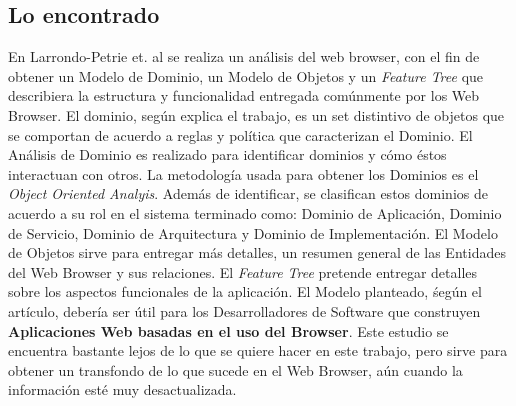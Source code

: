 \subsection{Lo encontrado}
En Larrondo-Petrie et. al \cite{535061} se realiza un análisis del web browser, con el fin de obtener un Modelo de Dominio, un Modelo de Objetos y un \textit{Feature Tree} que describiera la estructura y funcionalidad entregada comúnmente por los Web Browser. El dominio, según explica el trabajo, es un set distintivo de objetos que se comportan de acuerdo a reglas y política que caracterizan el Dominio. El Análisis de Dominio es realizado para identificar dominios y cómo éstos interactuan con otros. La metodología usada para obtener los Dominios es el \textit{Object Oriented Analyis}. Además de identificar, se clasifican estos dominios de acuerdo a su rol en el sistema terminado como: Dominio de Aplicación, Dominio de Servicio, Dominio de Arquitectura y Dominio de Implementación. El Modelo de Objetos sirve para entregar más detalles, un resumen general de las Entidades del Web Browser y sus relaciones. El \textit{Feature Tree} pretende entregar detalles sobre los aspectos funcionales de la aplicación. El Modelo planteado, śegún el artículo, debería ser útil para los Desarrolladores de Software que construyen \textbf{Aplicaciones Web basadas en el uso del Browser}.  Este estudio se encuentra bastante lejos de lo que se quiere hacer en este trabajo, pero sirve para obtener un transfondo de lo que sucede en el Web Browser, aún cuando la información esté muy desactualizada.



